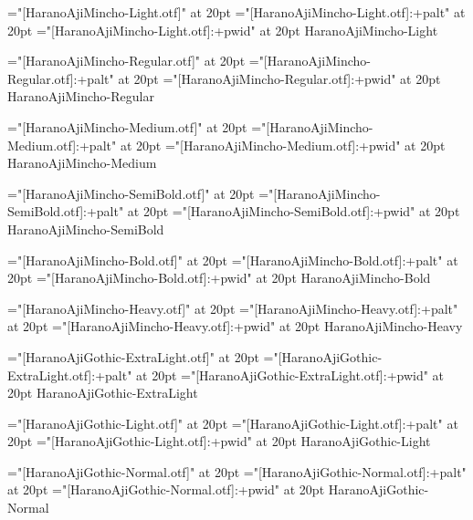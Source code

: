 \test
\vfil
\eject

\font\fnone="[HaranoAjiMincho-Light.otf]" at 20pt
\font\fpalt="[HaranoAjiMincho-Light.otf]:+palt" at 20pt
\font\fpwid="[HaranoAjiMincho-Light.otf]:+pwid" at 20pt
\fnone HaranoAjiMincho-Light

\test
\vfil
\eject

\font\fnone="[HaranoAjiMincho-Regular.otf]" at 20pt
\font\fpalt="[HaranoAjiMincho-Regular.otf]:+palt" at 20pt
\font\fpwid="[HaranoAjiMincho-Regular.otf]:+pwid" at 20pt
\fnone HaranoAjiMincho-Regular

\test
\vfil
\eject

\font\fnone="[HaranoAjiMincho-Medium.otf]" at 20pt
\font\fpalt="[HaranoAjiMincho-Medium.otf]:+palt" at 20pt
\font\fpwid="[HaranoAjiMincho-Medium.otf]:+pwid" at 20pt
\fnone HaranoAjiMincho-Medium

\test
\vfil
\eject

\font\fnone="[HaranoAjiMincho-SemiBold.otf]" at 20pt
\font\fpalt="[HaranoAjiMincho-SemiBold.otf]:+palt" at 20pt
\font\fpwid="[HaranoAjiMincho-SemiBold.otf]:+pwid" at 20pt
\fnone HaranoAjiMincho-SemiBold

\test
\vfil
\eject

\font\fnone="[HaranoAjiMincho-Bold.otf]" at 20pt
\font\fpalt="[HaranoAjiMincho-Bold.otf]:+palt" at 20pt
\font\fpwid="[HaranoAjiMincho-Bold.otf]:+pwid" at 20pt
\fnone HaranoAjiMincho-Bold

\test
\vfil
\eject

\font\fnone="[HaranoAjiMincho-Heavy.otf]" at 20pt
\font\fpalt="[HaranoAjiMincho-Heavy.otf]:+palt" at 20pt
\font\fpwid="[HaranoAjiMincho-Heavy.otf]:+pwid" at 20pt
\fnone HaranoAjiMincho-Heavy

\test
\vfil
\eject

\font\fnone="[HaranoAjiGothic-ExtraLight.otf]" at 20pt
\font\fpalt="[HaranoAjiGothic-ExtraLight.otf]:+palt" at 20pt
\font\fpwid="[HaranoAjiGothic-ExtraLight.otf]:+pwid" at 20pt
\fnone HaranoAjiGothic-ExtraLight

\test
\vfil
\eject

\font\fnone="[HaranoAjiGothic-Light.otf]" at 20pt
\font\fpalt="[HaranoAjiGothic-Light.otf]:+palt" at 20pt
\font\fpwid="[HaranoAjiGothic-Light.otf]:+pwid" at 20pt
\fnone HaranoAjiGothic-Light

\test
\vfil
\eject

\font\fnone="[HaranoAjiGothic-Normal.otf]" at 20pt
\font\fpalt="[HaranoAjiGothic-Normal.otf]:+palt" at 20pt
\font\fpwid="[HaranoAjiGothic-Normal.otf]:+pwid" at 20pt
\fnone HaranoAjiGothic-Normal

